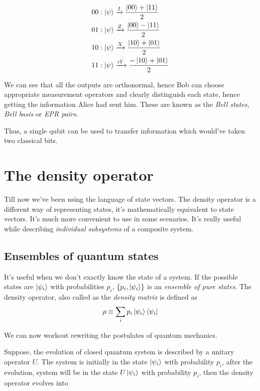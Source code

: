\begin{align}
    00 &: \ket{\psi} \xrightarrow{I} \frac{\ket{00}+\ket{11}}{2} \\
    01 &: \ket{\psi} \xrightarrow{Z}
    \frac{\ket{00}-\ket{11}}{2} \\
    10 &: \ket{\psi} \xrightarrow{X}
    \frac{\ket{10}+\ket{01}}{2} \\
    11 &: \ket{\psi} \xrightarrow{iY}
    \frac{-\ket{10}+\ket{01}}{2}
\end{align}

We can see that all the outputs are orthonormal, hence Bob can choose appropriate measurement operators and clearly distinguish each state, hence getting the information Alice had sent him.
These are known as the \textit{Bell states, Bell basis} or \textit{EPR pairs}.

Thus, a single qubit can be used to transfer information which would've taken two classical bits.

\section{The density operator}
Till now we've been using the language of state vectors. The density operator is a different way of representing states, it's mathematically equivalent to state vectors. It's much more convenient to use in some scenarios. It's really useful while describing \textit{individual subsystems} of a composite system.

\subsection{Ensembles of quantum states}
It's useful when we don't exactly know the state of a system. If the possible states are $\ket{\psi_i}$ with probabilities $p_i$, $\{p_i, \ket{\psi_i}\}$ is an \textit{ensemble of pure states}. The density operator, also called as the \textit{density matrix} is defined as
\begin{equation}
    \rho \equiv \sum_i p_i \ket{\psi_i}\bra{\psi_i}
\end{equation}

We can now workout rewriting the postulates of quantum mechanics. 

Suppose, the evolution of closed quantum system is described by a unitary operator $U$. The system is initially in the state $\ket{\psi_i}$ with probability $p_i$, after the evolution, system will be in the state $U\ket{\psi_i}$ with probability $p_i$, then the density operator evolves into

